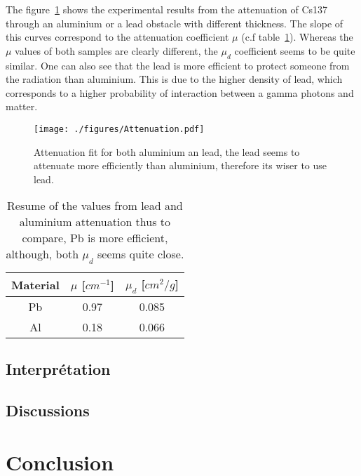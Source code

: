 \documentclass[a4paper,12pt,oneside]{article}
\begin{document}
The figure~\ref{fig:attenuation} shows the experimental results from the attenuation of Cs137 through an aluminium or a lead obstacle with different thickness. The slope of this curves correspond to the attenuation coefficient $\mu$ (c.f table~\ref{tab:attenuation}).
Whereas the $\mu$ values of both samples are clearly different, the $\mu_d$ coefficient seems to be quite similar. One can also see that the lead is more efficient to protect someone from the radiation than aluminium. This is due to the higher density of lead, which corresponds to a higher probability of interaction between a gamma photons and matter.

\begin{figure}[h!]
  \begin{center}
  \texttt{[image: ./figures/Attenuation.pdf]}
  \caption{Attenuation fit for both aluminium an lead, the lead seems to attenuate more efficiently than aluminium, therefore its wiser to use lead.} \label{fig:attenuation}
  \end{center}
\end{figure}

\begin{table}[h!]
\centering
	\begin{tabular}{|c|c|c|}
	   \hline
		Material & $\mu$ [$cm^{-1}$] & $\mu_d$ [$cm^2/g$]\\
		\hline
		Pb	& 0.97 & 0.085 \\
		Al	& 0.18 & 0.066 \\
	   	\hline
	\end{tabular}
	\caption{Resume of the values from lead and aluminium attenuation thus to compare, Pb is more efficient, although, both $\mu_d$ seems quite close.}
	\label{tab:attenuation}
\end{table}

\subsection{Interprétation}

\subsection{Discussions}
\section{Conclusion}






\begin{thebibliography}{99}
\end{thebibliography}
\end{document}
